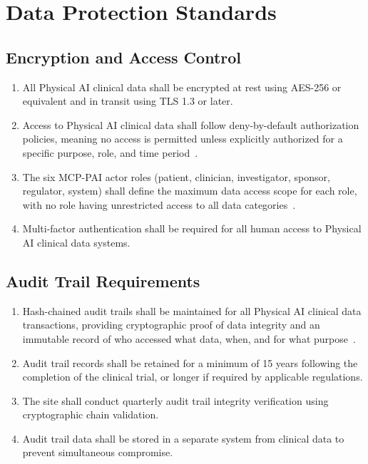 \documentclass[11pt,letterpaper]{article}
\begin{document}
\section{Data Protection Standards}

\subsection{Encryption and Access Control}

\begin{enumerate}[label=(\alph*)]
\item All Physical AI clinical data shall be encrypted at rest using AES-256 or
  equivalent and in transit using TLS 1.3 or later.

\item Access to Physical AI clinical data shall follow deny-by-default
  authorization policies, meaning no access is permitted unless explicitly
  authorized for a specific purpose, role, and time period~\cite{iche6r3adapt}.

\item The six MCP-PAI actor roles (patient, clinician, investigator, sponsor,
  regulator, system) shall define the maximum data access scope for each
  role, with no role having unrestricted access to all data
  categories~\cite{iche6r3adapt}.

\item Multi-factor authentication shall be required for all human access to
  Physical AI clinical data systems.
\end{enumerate}

\subsection{Audit Trail Requirements}

\begin{enumerate}[label=(\alph*)]
\item Hash-chained audit trails shall be maintained for all Physical AI clinical
  data transactions, providing cryptographic proof of data integrity and an
  immutable record of who accessed what data, when, and for what
  purpose~\cite{iche6r3adapt}.

\item Audit trail records shall be retained for a minimum of 15 years following
  the completion of the clinical trial, or longer if required by applicable
  regulations.

\item The site shall conduct quarterly audit trail integrity verification using
  cryptographic chain validation.

\item Audit trail data shall be stored in a separate system from clinical data
  to prevent simultaneous compromise.
\end{enumerate}
\end{document}
